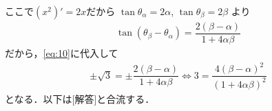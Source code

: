 \documentclass[../../main.tex]{subfiles}
\begin{document}
ここで$(x^2)'=2x$だから $\tan\theta_\alpha = 2\alpha$, $\tan\theta_\beta = 2\beta$ より
\begin{align}
  \tan(\theta_\beta - \theta_\alpha) = \dfrac{2(\beta-\alpha)}{1+4\alpha\beta}
\end{align}
だから，\cref{eq:10}に代入して
\begin{align}
  \pm \sqrt{3} = \pm \dfrac{2(\beta-\alpha)}{1+4\alpha\beta}
  \iff
  3 = \dfrac{4(\beta-\alpha)^2}{(1+4\alpha\beta)^2}
\end{align}
となる．以下は[解答]と合流する．
\end{document}

